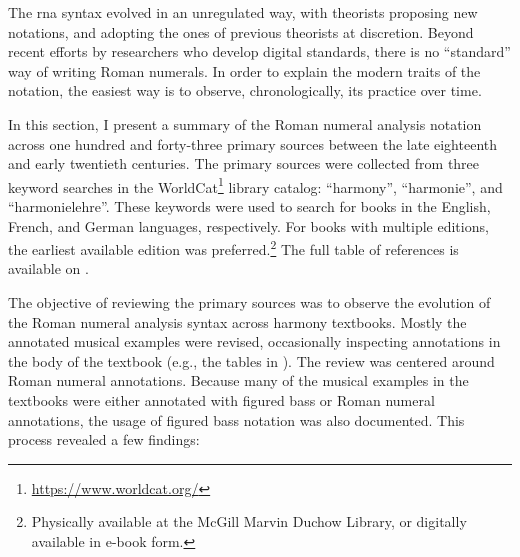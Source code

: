 

The \gls{rna} syntax evolved in an unregulated way, with
theorists proposing new notations, and adopting the ones of
previous theorists at discretion. Beyond recent efforts by
researchers who develop digital standards, there is no
``standard'' way of writing Roman numerals. In order to
explain the modern traits of the notation, the easiest way
is to observe, chronologically, its practice over time.

In this section, I present a summary of the Roman numeral
analysis notation across one hundred and forty-three primary
sources between the late eighteenth and early twentieth
centuries. The primary sources were collected from three
keyword searches in the
WorldCat\footnote{\href{https://www.worldcat.org/}{https://www.worldcat.org/}}
library catalog: ``harmony'', ``harmonie'', and
``harmonielehre''. These keywords were used to search for
books in the English, French, and German languages,
respectively. For books with multiple editions, the earliest
available edition was preferred.\footnote{Physically
available at the McGill Marvin Duchow Library, or digitally
available in e-book form.} The full table of references is
available on .



The objective of reviewing the primary sources was to
observe the evolution of the Roman numeral analysis syntax
across harmony textbooks. Mostly the annotated musical
examples were revised, occasionally inspecting annotations
in the body of the textbook (e.g., the tables in
\textcite{kirnberger1774kunst}). The review was centered
around Roman numeral annotations. Because many of the
musical examples in the textbooks were either annotated with
figured bass or Roman numeral annotations, the usage of
figured bass notation was also documented. This process
revealed a few findings:

